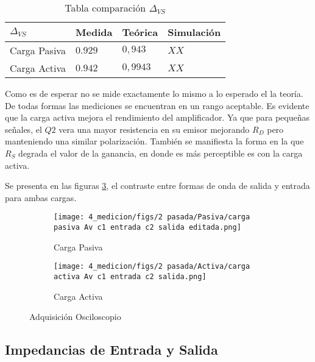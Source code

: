 \begin{table}[ht]
    \centering
    \begin{tabular}{|l|l|l|l|}
    \hline
    $\Delta_{VS} $  & Medida   & Teórica  & Simulación \\ \hline
    Carga Pasiva & $0.929$  & $0,943$ &  $XX$       \\ \hline
    Carga Activa & $0.942$  & $0,9943$ &  $XX$          \\ \hline
    \end{tabular}
    \caption{Tabla comparación $\Delta_{VS}$}\label{table:comp avs}
\end{table}

Como es de esperar no se mide exactamente lo mismo a lo esperado el la teoría. De todas formas las mediciones se encuentran en un rango aceptable. 
Es evidente que la carga activa mejora el rendimiento del amplificador. Ya que para pequeñas señales, el $Q2$ vera una mayor resistencia en su emisor mejorando $R_D$ pero manteniendo una similar polarización. 
También se manifiesta la forma en la que $R_S$ degrada el valor de la ganancia, en donde es más perceptible es con la carga activa. 

Se presenta en las figuras \ref{fig:Av oscilo}, el contraste entre formas de onda de salida y entrada para ambas cargas.


\begin{figure}[ht]
\begin{subfigure}{.45\textwidth}
  \centering
  \texttt{[image: 4\_medicion/figs/2 pasada/Pasiva/carga pasiva Av c1 entrada c2 salida editada.png]}  
  \caption{Carga Pasiva}
  \label{fig:Av carga pasiva}
\end{subfigure}
\begin{subfigure}{.45\textwidth}
  \centering
  \texttt{[image: 4\_medicion/figs/2 pasada/Activa/carga activa Av c1 entrada c2 salida.png]}  
  \caption{Carga Activa}
  \label{fig:Av carga activa}
\end{subfigure}
\caption{Adquisición Osciloscopio}
\label{fig:Av oscilo}
\end{figure}

\subsection{Impedancias de Entrada y Salida}

